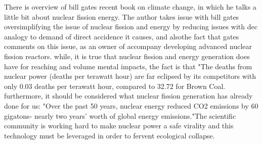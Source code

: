 \documentclass[12pt,letterpaper]{article}
\begin{document}
\begin{flushleft}
There is overview of bill gates recent book on climate change, in which he talks a little bit about nuclear fission energy. The author takes issue with  bill gates oversimplifying the issue of nuclear fission and energy by reducing issues with dec analogy to demand of direct accidence it causes, and alsothe fact that gates comments on this issue, as an owner of accompany developing advanced nuclear fission reactors. while, it is true that nuclear fission and energy generation does have for reaching and volume mental impacts, the fact is that "The deaths from nuclear power (deaths per terawatt hour) are far eclipsed by its competitors with only 0.03 deaths per terawatt hour, compared to 32.72 for Brown Coal.  furthermore, it should be considered what nuclear fission generation has already done for us: "Over the past 50 years, nuclear energy reduced CO2 emissions by 60 gigatons- nearly two years’ worth of global energy emissions."The scientific community is working hard to make nuclear power a safe virality  and this technology must be leveraged in order to fervent ecological collapse.

\newpage

\printbibliography


\end{flushleft}
\end{document}
